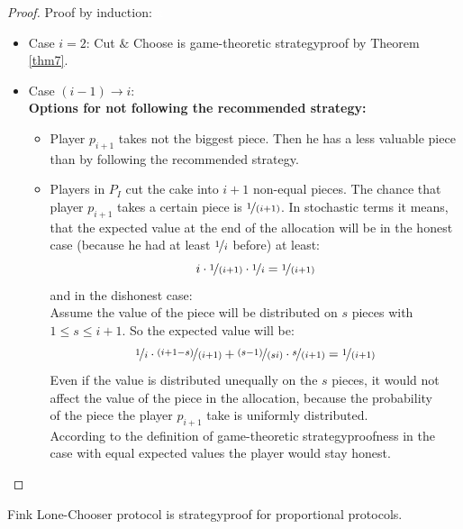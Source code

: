 \begin{proof} Proof by induction:
\textcolor{white}{x}
\begin{itemize} \item{Case} $i=2$: Cut $\&$ Choose is game-theoretic strategyproof by Theorem \ref{thm7}.\\
\item{Case} $(i-1) \rightarrow i$:\\ 
\newline
\textbf{Options for not following the recommended strategy:}\\
\begin{itemize}
\item Player $p_{i+1}$ takes not the biggest piece. Then he has a less valuable piece\\than by following the recommended strategy. 
\item Players in $P_I$ cut the cake into $i+1$ non-equal pieces. The chance that\\player $p_{i+1}$ takes a certain piece is $\nicefrac{1}{(i+1)}$. In stochastic terms it means,\\that the expected value at the end of the allocation will be in the honest\\case (because he had at least $\nicefrac{1}{i}$ before) at least: $$ i \cdot \nicefrac{1}{(i+1)} \cdot \nicefrac{1}{i} =\nicefrac{1}{(i+1)} $$ and in the dishonest case:\\
Assume the value of the piece will be distributed on $s$ pieces with\\$1 \leq s \leq i+1$. So the expected value will be: $$ \nicefrac{1}{i} \cdot \nicefrac{(i+1-s)}{(i+1)} + \nicefrac{(s-1)}{(si)}\cdot \nicefrac{s}{(i+1)} =\nicefrac{1}{(i+1)} $$ Even if the value is distributed unequally on the $s$ pieces, it would not\\affect the value of the piece in the allocation, because the probability\\of the piece the player $p_{i+1}$ take is uniformly distributed.\\
 \newpage According to the definition of game-theoretic strategyproofness in the\\case with equal expected values the player would stay honest.
\end{itemize}
\end{itemize}
\end{proof}
\begin{lem}
\label{lc2}
Fink Lone-Chooser protocol is strategyproof for proportional protocols.
\end{lem}
